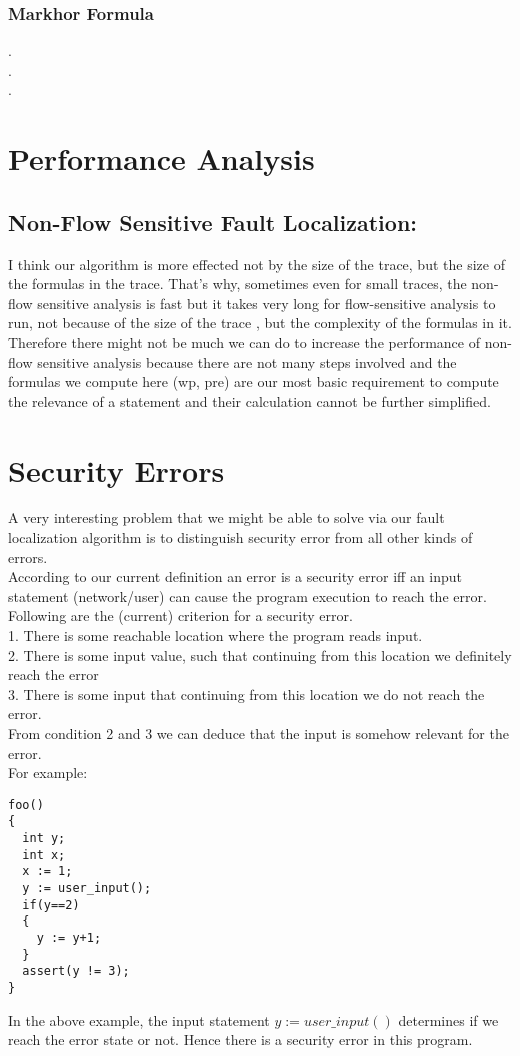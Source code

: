 \documentclass{article}
\begin{document}
\subsubsection{Markhor Formula}
.\\
.\\
.

\section{Performance Analysis}
\subsection{Non-Flow Sensitive Fault Localization:}
I think our algorithm is more effected not by the size of the trace, but the size of the formulas in the trace. That's why, sometimes even for small traces, the non-flow sensitive analysis is fast but it takes very long for flow-sensitive analysis to run, not because  of the size of the trace , but the complexity of the formulas in it. \\
Therefore there might not be much we can do to increase the performance of non-flow sensitive analysis because there are not many steps involved and the formulas we compute here (wp, pre) are our most basic requirement to compute the relevance of a statement and their calculation cannot be further simplified.


\section{Security Errors}
A very interesting problem that we might be able to solve via our fault localization algorithm is to distinguish security error from all other kinds of errors. \\
According to our current definition an error is a security error iff an input statement (network/user) can cause the program execution to reach the error. Following are the (current) criterion for a security error.\\
1. There is some reachable location where the program reads input.\\
2. There is some input value, such that continuing from this location we definitely reach
the error\\
3. There is some input that continuing from this location we do not reach the error.
\\
From condition 2 and 3 we can deduce that the input is somehow relevant for the error.\\
For example:
\begin{lstlisting}
foo()
{
  int y;
  int x;
  x := 1;
  y := user_input();
  if(y==2) 
  {
    y := y+1;
  }
  assert(y != 3);
}
\end{lstlisting}
In the above example, the input statement $y := user\_input()$ determines if we reach the error state or not. Hence there is a security error in this program.
\end{document}
